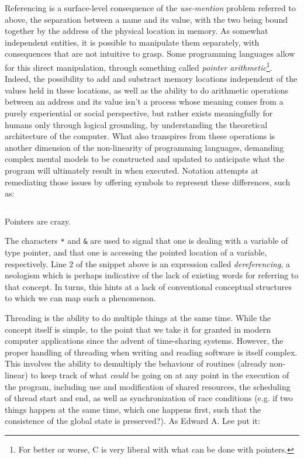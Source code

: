 Referencing is a surface-level consequence of the \emph{use-mention} problem referred to above, the separation between a name and its value, with the two being bound together by the address of the physical location in memory. As somewhat independent entities, it is possible to manipulate them separately, with consequences that are not intuitive to grasp. Some programming languages allow for this direct manipulation, through something called \emph{pointer arithmetic}\footnote{For better or worse, C is very liberal with what can be done with pointers.}. Indeed, the possibility to add and substract memory locations independent of the values held in these locations, as well as the ability to do arithmetic operations between an address and its value isn't a process whose meaning comes from a purely experiential or social perspective, but rather exists meaningfully for humans only through logical grounding, by understanding the theoretical architecture of the computer. What also transpires from these operations is another dimension of the non-linearity of programming languages, demanding complex mental models to be constructed and updated to anticipate what the program will ultimately result in when executed. Notation attempts at remediating those issues by offering symbols to represent these differences, such as:

\begin{listing}
  \inputminted{python}{./corpus/references.c}
  \caption{Pointers are crazy.}
  \label{code:references-c}
\end{listing}

The characters \lstinline{*} and \lstinline{&} are used to signal that one is dealing with a variable of type pointer, and that one is accessing the pointed location of a variable, respectively. Line 2 of the snippet above is an expression called \emph{dereferencing}, a neologism which is perhaps indicative of the lack of existing words for referring to that concept. In turns, this hints at a lack of conventional conceptual structures to which we can map such a phenomenon.

Threading is the ability to do multiple things at the same time. While the concept itself is simple, to the point that we take it for granted in modern computer applications since the advent of time-sharing systems. However, the proper handling of threading when writing and reading software is itself complex. This involves the ability to demultiply the behaviour of routines (already non-linear) to keep track of what \emph{could} be going on at any point in the execution of the program, including use and modification of shared resources, the scheduling of thread start and end, as well as synchronization of race conditions (e.g. if two things happen at the same time, which one happens first, such that the consistence of the global state is preserved?). As Edward A. Lee put it:

